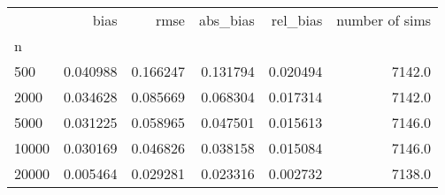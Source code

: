 \begin{tabular}{lrrrrr}
\toprule
{} &      bias &      rmse &  abs_bias &  rel_bias &  number of sims \\
n     &           &           &           &           &                 \\
\midrule
500   &  0.040988 &  0.166247 &  0.131794 &  0.020494 &          7142.0 \\
2000  &  0.034628 &  0.085669 &  0.068304 &  0.017314 &          7142.0 \\
5000  &  0.031225 &  0.058965 &  0.047501 &  0.015613 &          7146.0 \\
10000 &  0.030169 &  0.046826 &  0.038158 &  0.015084 &          7146.0 \\
20000 &  0.005464 &  0.029281 &  0.023316 &  0.002732 &          7138.0 \\
\bottomrule
\end{tabular}
